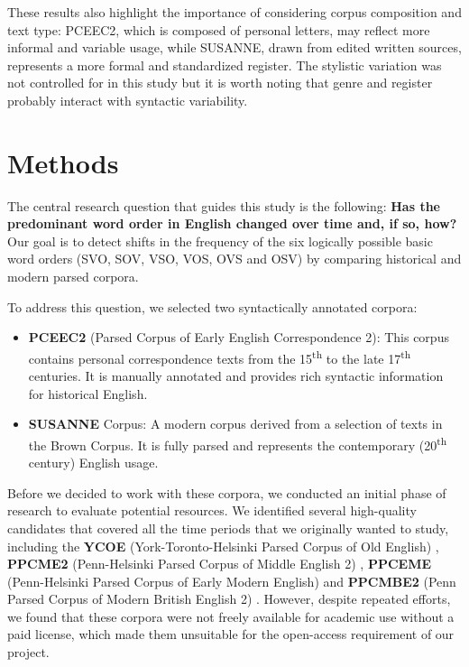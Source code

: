 \documentclass{article}
\begin{document}
These results also highlight the importance of considering corpus composition and text type: PCEEC2, which is composed of personal letters, may reflect more informal and variable usage, while SUSANNE, drawn from edited written sources, represents a more formal and standardized register. The stylistic variation was not controlled for in this study but it is worth noting that genre and register probably interact with syntactic variability.

\section{Methods}

The central research question that guides this study is the following: \textbf{Has the predominant word order in English changed over time and, if so, how?} Our goal is to detect shifts in the frequency of the six logically possible basic word orders (SVO, SOV, VSO, VOS, OVS and OSV) by comparing historical and modern parsed corpora.

To address this question, we selected two syntactically annotated corpora:

\begin{itemize}
    \item \textbf{PCEEC2} (Parsed Corpus of Early English Correspondence 2): This corpus contains personal correspondence texts from the 15\textsuperscript{th} to the late 17\textsuperscript{th} centuries. It is manually annotated and provides rich syntactic information for historical English.
    \item \textbf{SUSANNE} Corpus: A modern corpus derived from a selection of texts in the Brown Corpus. It is fully parsed and represents the contemporary (20\textsuperscript{th} century) English usage.
\end{itemize}

Before we decided to work with these corpora, we conducted an initial phase of research to evaluate potential resources. We identified several high-quality candidates \cite{Taylor2020} that covered all the time periods that we originally wanted to study, including the \textbf{YCOE} (York-Toronto-Helsinki Parsed Corpus of Old English) \cite{YCOE}, \textbf{PPCME2} (Penn-Helsinki Parsed Corpus of Middle English 2) \cite{PPCME2}, \textbf{PPCEME} (Penn-Helsinki Parsed Corpus of Early Modern English) \cite{PPCEME} and \textbf{PPCMBE2} (Penn Parsed Corpus of Modern British English 2) \cite{PPCMBE2}. However, despite repeated efforts, we found that these corpora were not freely available for academic use without a paid license, which made them unsuitable for the open-access requirement of our project.
\end{document}
